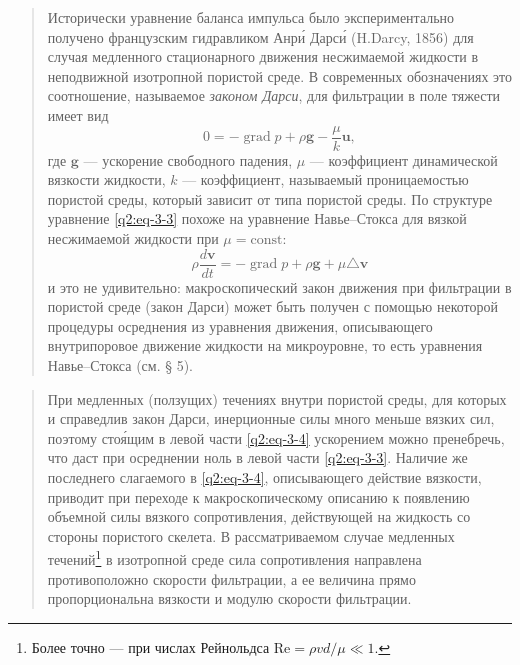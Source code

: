 \documentclass[12pt,a4paper]{article}
\DeclareMathOperator{\grad}{grad}
\newcommand{\Rey}{\mathrm{Re}}
\newenvironment{textquote}{\begin{quote}\sloppy}{\end{quote}}
\begin{document}
\begin{textquote}
Исторически уравнение баланса импульса было экспериментально получено французским гидравликом Анр\'и Дарс\'и (H.Darcy, 1856) для случая медленного стационарного движения несжимаемой жидкости в неподвижной изотропной пористой
среде. В современных обозначениях это соотношение, называемое \textit{законом Дарси}, для фильтрации в поле тяжести имеет вид
\begin{equation}
0=-\grad p+\rho\boldsymbol{g}-\frac{\mu}{k}\boldsymbol{u},
\tag{3.3}\label{q2:eq-3-3}
\end{equation}
где $\boldsymbol{g}$ --- ускорение свободного падения, $\mu$ --- коэффициент динамической вязкости жидкости, $k$ --- коэффициент, называемый проницаемостью пористой среды, который зависит от типа пористой среды. По структуре уравнение \eqref{q2:eq-3-3} похоже на уравнение Навье--Стокса для вязкой несжимаемой жидкости при $\mu=\mathrm{const}$:
\begin{equation}
\rho\frac{d\boldsymbol{v}}{dt}=-\grad p+\rho\boldsymbol{g}+\mu\triangle\boldsymbol{v}
\tag{3.4}\label{q2:eq-3-4}
\end{equation}
и это не удивительно: макроскопический закон движения при фильтрации в пористой среде (закон Дарси) может быть получен с помощью некоторой процедуры осреднения из уравнения движения, описывающего внутрипоровое движение жидкости на микроуровне, то есть уравнения Навье--Стокса (см. § 5).
\end{textquote}

\begin{textquote}
При медленных (ползущих) течениях внутри пористой среды, для которых и справедлив закон Дарси, инерционные силы много меньше вязких сил, поэтому сто\'ящим в левой части \eqref{q2:eq-3-4} ускорением можно пренебречь, что даст при осреднении ноль в левой части \eqref{q2:eq-3-3}. Наличие же последнего слагаемого в \eqref{q2:eq-3-4}, описывающего действие вязкости, приводит при переходе к макроскопическому описанию к появлению объемной силы вязкого сопротивления, действующей на жидкость со стороны пористого скелета. В рассматриваемом случае медленных течений\footnote[1]{Более точно --- при числах Рейнольдса $\Rey=\rho vd/\mu\ll1$.} в изотропной среде сила сопротивления направлена противоположно скорости фильтрации, а ее величина прямо пропорциональна вязкости и модулю скорости фильтрации.
\end{textquote}
\end{document}
